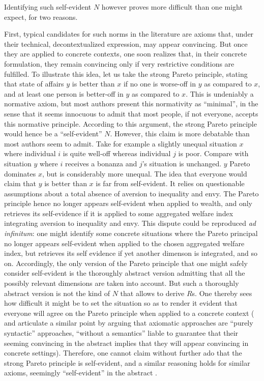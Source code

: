 \documentclass[preprint, french, english, 11pt, authoryear]{elsarticle}%
\begin{document}
Identifying such self-evident $N$ however proves more difficult than one might expect, for two reasons.

First, typical candidates for such norms in the literature are axioms that, under their technical, decontextualized expression, may appear convincing. But once they are applied to concrete contexts, one soon realizes that, in their concrete formulation, they remain convincing only if very restrictive conditions are fulfilled. To illustrate this idea, let us take the strong Pareto principle, stating that state of affairs $y$ is better than $x$ if no one is worse-off in $y$ as compared to $x$, and at least one person is better-off in $y$ as compared to $x$. This is undeniably a normative axiom, but most authors present this normativity as “minimal”, in the sense that it seems innocuous to admit that most people, if not everyone, accepts this normative principle. According to this argument, the strong Pareto principle would hence be a “self-evident” $N$. However, this claim is more debatable than most authors seem to admit. Take for example a slightly unequal situation $x$ where individual $i$ is quite well-off whereas individual $j$ is poor. Compare with situation $y$ where $i$ receives a bonanza and $j$'s situation is unchanged. $y$ Pareto dominates $x$, but is considerably more unequal. The idea that everyone would claim that $y$ is better than $x$ is far from self-evident. It relies on questionable assumptions about a total absence of aversion to inequality and envy. The Pareto principle hence no longer appears self-evident when applied to wealth, and only retrieves its self-evidence if it is applied to some aggregated welfare index integrating aversion to inequality and envy. This dispute could be reproduced \emph{ad infinitum}: one might identify some concrete situations where the Pareto principal no longer appears self-evident when applied to the chosen aggregated welfare index, but retrieves its self evidence if yet another dimenson is integrated, and so on. Accordingly, the only version of the Pareto principle that one might safely consider self-evident is the thoroughly abstract version admitting that all the possibly relevant dimensions are taken into account. But such a thoroughly abstract version is not the kind of $N$ that allows to derive $R$s. One thereby sees how difficult it might be to set the situation so as to render it evident that everyone will agree on the Pareto principle when applied to a concrete context (\citet{mongin_axiomatisation_2003} and \citet{baujard_bien-etre_2015} articulate a similar point by arguing that axiomatic approaches are “purely syntactic” approaches, “without a semantics” liable to guarantee that their seeming convincing in the abstract implies that they will appear convincing in concrete settings). Therefore, one cannot claim without further ado that the strong Pareto principle is self-evident, and a similar reasoning holds for similar axioms, seemingly “self-evident” in the abstract \citep{sen_maximization_1997}.
\end{document}
